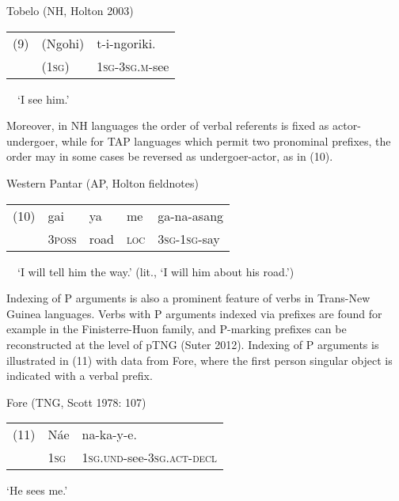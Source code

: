 Tobelo (NH, Holton 2003)

\begin{flushleft}
\tablehead{}
\begin{supertabular}{m{0.48795983in}m{0.70875984in}m{2.06016in}}
(9) &
(Ngohi) &
t-i-ngoriki.\\
 &
(\textsc{1sg}) &
\textsc{1sg-3sg.m}{}-see\\
\end{supertabular}
\end{flushleft}
\ \ {\textquoteleft}I see him.{\textquoteright}  

Moreover, in NH languages the order of verbal referents is fixed as actor-undergoer, while for TAP languages which permit two pronominal prefixes, the order may in some cases be reversed as undergoer-actor, as in (10).

Western Pantar (AP, Holton fieldnotes)

\begin{flushleft}
\tablehead{}
\begin{supertabular}{m{0.39005986in}m{0.46985987in}m{0.36775985in}m{0.33515984in}m{0.9094598in}}
(10) &
gai &
ya &
me &
ga-na-asang\\
 &
\textsc{3poss} &
road &
\textsc{loc} &
\textsc{3sg-1sg}{}-say\\
\end{supertabular}
\end{flushleft}
\ \ {\textquoteleft}I will tell him the way.{\textquoteright} (lit., {\textquoteleft}I will him about his road.{\textquoteright})

Indexing of P arguments is also a prominent feature of verbs in Trans-New Guinea languages. Verbs with P arguments indexed via prefixes are found for example in the Finisterre-Huon family, and P-marking prefixes can be reconstructed at the level of pTNG (Suter 2012). Indexing of P arguments is illustrated in (11) with data from Fore, where the first person singular object is indicated with a verbal prefix.

Fore (TNG, Scott 1978: 107)

\begin{flushleft}
\tablehead{}
\begin{supertabular}{m{0.32545984in}m{0.31775984in}m{1.8156599in}}
(11) &
N\'ae &
na-ka-y-e.\\
 &
1\textsc{sg} &
\textsc{1sg.und}{}-see-\textsc{3sg.act-decl}\\
\end{supertabular}
\end{flushleft}
{\textquoteleft}He sees me.{\textquoteright}

